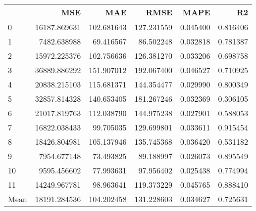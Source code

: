 \begin{tabular}{lrrrrr}
\toprule
 & MSE & MAE & RMSE & MAPE & R2 \\
\midrule
0 & 16187.869631 & 102.681643 & 127.231559 & 0.045400 & 0.816406 \\
1 & 7482.638988 & 69.416567 & 86.502248 & 0.032818 & 0.781387 \\
2 & 15972.225376 & 102.756636 & 126.381270 & 0.033206 & 0.698758 \\
3 & 36889.886292 & 151.907012 & 192.067400 & 0.046527 & 0.710925 \\
4 & 20838.215103 & 115.681371 & 144.354477 & 0.029990 & 0.800349 \\
5 & 32857.814328 & 140.653405 & 181.267246 & 0.032369 & 0.306105 \\
6 & 21017.819763 & 112.038790 & 144.975238 & 0.027901 & 0.588053 \\
7 & 16822.038433 & 99.705035 & 129.699801 & 0.033611 & 0.915454 \\
8 & 18426.804981 & 105.137946 & 135.745368 & 0.036420 & 0.531182 \\
9 & 7954.677148 & 73.493825 & 89.188997 & 0.026073 & 0.895549 \\
10 & 9595.456602 & 77.993631 & 97.956402 & 0.025438 & 0.774994 \\
11 & 14249.967781 & 98.963641 & 119.373229 & 0.045765 & 0.888410 \\
Mean & 18191.284536 & 104.202458 & 131.228603 & 0.034627 & 0.725631 \\
\bottomrule
\end{tabular}
